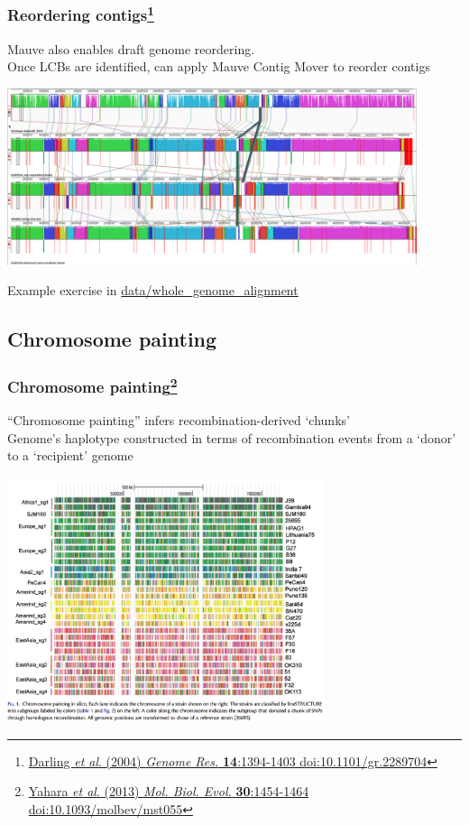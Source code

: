 \begin{frame}
  \frametitle{Reordering contigs\footnote{\tiny{\href{http://dx.doi.org/10.1101/gr.2289704}{Darling \textit{et al}. (2004) \textit{Genome Res.} \textbf{14}:1394-1403 doi:10.1101/gr.2289704}}}}
  Mauve also enables draft genome reordering.\\
  Once LCBs are identified, can apply Mauve Contig Mover to reorder contigs
  \begin{center}
    \includegraphics[width=0.9\textwidth]{images/mauve_dickeya}
  \end{center}    
  Example exercise in \url{data/whole_genome_alignment}
\end{frame}


\subsection{Chromosome painting}

\begin{frame}
  \frametitle{Chromosome painting\footnote{\tiny{\href{http://dx.doi.org/10.1093/molbev/mst055}{Yahara \textit{et al}. (2013) \textit{Mol. Biol. Evol.} \textbf{30}:1454-1464 doi:10.1093/molbev/mst055}}}}
  ``Chromosome painting'' infers recombination-derived `chunks'\\
  Genome's haplotype constructed in terms of recombination events from a `donor' to a `recipient' genome\\
  \begin{center}
    \includegraphics[width=0.7\textwidth]{images/chromosome_painting}
  \end{center}     
\end{frame}

